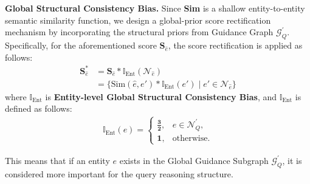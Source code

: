 \documentclass[11pt]{article}
\begin{document}
\textbf{Global Structural Consistency Bias.} Since \textbf{Sim} is a shallow entity-to-entity semantic similarity function, we design a global-prior score rectification mechanism by incorporating the structural priors from Guidance Graph \( \mathcal{G}^{'}_Q \). Specifically, for the aforementioned score $\boldsymbol{S}_{\hat{e}}$, the score rectification is applied as follows:
\begin{align}
\boldsymbol{S}^*_{\hat{e}} &= \boldsymbol{S}_{\hat{e}} * \mathbb{I}_\text{Ent}(\mathcal{N}_{\hat{e}}) \nonumber \\
&=\{\mathrm{Sim}(\hat{e}, e')*\mathbb{I}_\text{Ent}(e') \mid e' \in \mathcal{N}_{\hat{e}}\}
\label{entity_bias}
\end{align}
where $\mathbb{I}_\text{Ent}$ is \textbf{Entity-level Global Structural Consistency Bias}, and $\mathbb{I}_\text{Ent}$ is defined as follows:
\begin{align}
\mathbb{I}_\text{Ent}(e) = \begin{cases} 
\boldsymbol{\frac{3}{2}}, & e \in \mathcal{N}^{'}_Q, \\
\boldsymbol{1}, & \text{otherwise}.
\end{cases}
\label{eq:weighting_func}
\end{align}

This means that if an entity $e$ exists in the Global Guidance Subgraph $\mathcal{G}^{'}_Q$, it is considered more important for the query reasoning structure. 
\end{document}
